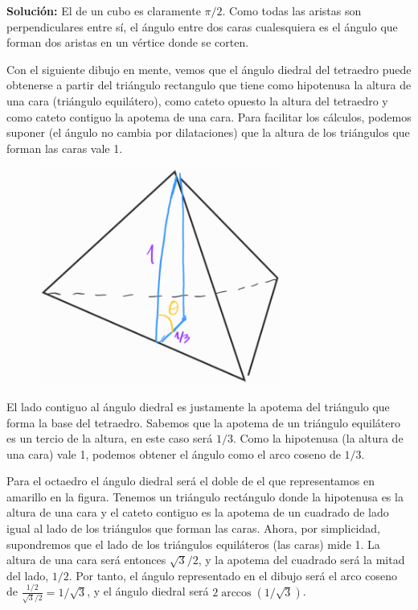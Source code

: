 \documentclass{amsart}
\begin{document}
\textbf{Solución:} El de un cubo es claramente $\pi/2$. Como todas las aristas son perpendiculares entre sí, el ángulo entre dos caras cualesquiera es el ángulo que forman dos aristas en un vértice donde se corten.

Con el siguiente dibujo en mente, vemos que el ángulo diedral del tetraedro puede obtenerse a partir del triángulo rectangulo que tiene como hipotenusa la altura de una cara (triángulo equilátero), como cateto opuesto la altura del tetraedro y como cateto contiguo la apotema de una cara. Para facilitar los cálculos, podemos suponer (el ángulo no cambia por dilataciones) que la altura de los triángulos que forman las caras vale 1.

\begin{figure}[H]
	\includegraphics[width=80mm]{imgs/diedral-tetraedro}
\end{figure}

El lado contiguo al ángulo diedral es justamente la apotema del triángulo que forma la base del tetraedro. Sabemos que la apotema de un triángulo equilátero es un tercio de la altura, en este caso será $1/3$. Como la hipotenusa (la altura de una cara) vale 1, podemos obtener el ángulo como el arco coseno de $1/3$.

Para el octaedro el ángulo diedral será el doble de el que representamos en amarillo en la figura. Tenemos un triángulo rectángulo donde la hipotenusa es la altura de una cara y el cateto contiguo es la apotema de un cuadrado de lado igual al lado de los triángulos que forman las caras. Ahora, por simplicidad, supondremos que el lado de los triángulos equiláteros (las caras) mide 1. La altura de una cara será entonces $\sqrt{3}/2$, y la apotema del cuadrado será la mitad del lado, $1/2$. Por tanto, el ángulo representado en el dibujo será el arco coseno de $\frac{1/2}{\sqrt{3}/2}=1/\sqrt{3}$, y el ángulo diedral será $2\arccos{(1/\sqrt{3})}$.
\end{document}
